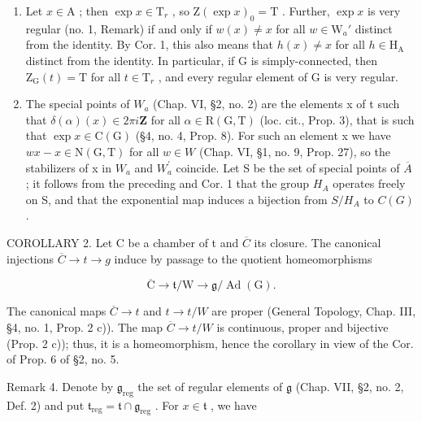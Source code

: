 \begin{enumerate}
\def\labelenumi{\arabic{enumi})}
\setcounter{enumi}{1}
\item
  Let \(x \in \mathrm{A}\) ; then \(\exp x \in \mathrm{T}_r\) , so \(\mathrm{Z}(\exp x)_0 = \mathrm{T}\) . Further, \(\exp x\) is very regular (no. 1, Remark) if and only if \(w(x) \neq x\) for all \(w \in \mathrm{W}_a'\) distinct from the identity. By Cor. 1, this also means that \(h(x) \neq x\) for all \(h \in \mathrm{H}_{\mathrm{A}}\) distinct from the identity. In particular, if \(\mathrm{G}\) is simply-connected, then \(\mathrm{Z}_{\mathrm{G}}(t) = \mathrm{T}\) for all \(t \in \mathrm{T}_r\) , and every regular element of \(\mathrm{G}\) is very regular.
\item
  The special points of \(W_{a}\) (Chap. VI, §2, no. 2) are the elements x of t such that \(\delta(\alpha)(x) \in 2\pi i\mathbf{Z}\) for all \(\alpha \in \mathrm{R}(\mathrm{G}, \mathrm{T})\) (loc. cit., Prop. 3), that is such that \(\exp x \in \mathrm{C}(\mathrm{G})\) (§4, no. 4, Prop. 8). For such an element x we have \(wx - x \in \mathrm{N}(\mathrm{G}, \mathrm{T})\) for all \(w \in W\) (Chap. VI, §1, no. 9, Prop. 27), so the stabilizers of x in \(W_{a}\) and \(W_{a}^{\prime}\) coincide. Let S be the set of special points of \(\overline{A}\) ; it follows from the preceding and Cor. 1 that the group \(H_{A}\) operates freely on S, and that the exponential map induces a bijection from \(S/H_{A}\) to \(C(G)\) .
\end{enumerate}

COROLLARY 2. Let C be a chamber of t and \(\overline{C}\) its closure. The canonical injections \(\overline{C} \rightarrow t \rightarrow g\) induce by passage to the quotient homeomorphisms

\[
\overline {{\mathrm{C}}} \rightarrow \mathfrak {t} / \mathrm{W} \rightarrow \mathfrak {g} / \operatorname{Ad} (\mathrm{G}).
\]

The canonical maps \(\overline{C} \rightarrow t\) and \(t \rightarrow t/W\) are proper (General Topology, Chap. III, §4, no. 1, Prop. 2 c)). The map \(\overline{C} \rightarrow t/W\) is continuous, proper and bijective (Prop. 2 c)); thus, it is a homeomorphism, hence the corollary in view of the Cor. of Prop. 6 of §2, no. 5.

Remark 4. Denote by \(\mathfrak{g}_{\mathrm{reg}}\) the set of regular elements of \(\mathfrak{g}\) (Chap. VII, §2, no. 2, Def. 2) and put \(\mathfrak{t}_{\mathrm{reg}} = \mathfrak{t} \cap \mathfrak{g}_{\mathrm{reg}}\) . For \(x \in \mathfrak{t}\) , we have

